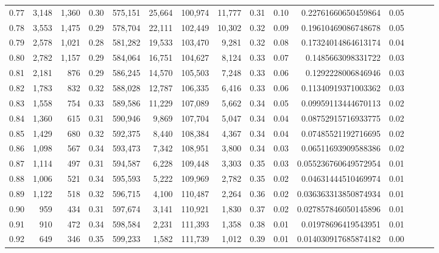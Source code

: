 \begin{tabular}{rrrrrrrrrrrrrrr}
0.77 &   3,148 &  1,360 &  0.30 &  575,151 &   25,664 &  100,974 &   11,777 &  0.31 &  0.10 &     0.22761660650459864 &      0.05 \\
0.78 &   3,553 &  1,475 &  0.29 &  578,704 &   22,111 &  102,449 &   10,302 &  0.32 &  0.09 &     0.19610469086748678 &      0.05 \\
0.79 &   2,578 &  1,021 &  0.28 &  581,282 &   19,533 &  103,470 &    9,281 &  0.32 &  0.08 &     0.17324014864613174 &      0.04 \\
0.80 &   2,782 &  1,157 &  0.29 &  584,064 &   16,751 &  104,627 &    8,124 &  0.33 &  0.07 &      0.1485663098331722 &      0.03 \\
0.81 &   2,181 &    876 &  0.29 &  586,245 &   14,570 &  105,503 &    7,248 &  0.33 &  0.06 &      0.1292228006846946 &      0.03 \\
0.82 &   1,783 &    832 &  0.32 &  588,028 &   12,787 &  106,335 &    6,416 &  0.33 &  0.06 &     0.11340919371003362 &      0.03 \\
0.83 &   1,558 &    754 &  0.33 &  589,586 &   11,229 &  107,089 &    5,662 &  0.34 &  0.05 &     0.09959113444670113 &      0.02 \\
0.84 &   1,360 &    615 &  0.31 &  590,946 &    9,869 &  107,704 &    5,047 &  0.34 &  0.04 &     0.08752915716933775 &      0.02 \\
0.85 &   1,429 &    680 &  0.32 &  592,375 &    8,440 &  108,384 &    4,367 &  0.34 &  0.04 &     0.07485521192716695 &      0.02 \\
0.86 &   1,098 &    567 &  0.34 &  593,473 &    7,342 &  108,951 &    3,800 &  0.34 &  0.03 &     0.06511693909588386 &      0.02 \\
0.87 &   1,114 &    497 &  0.31 &  594,587 &    6,228 &  109,448 &    3,303 &  0.35 &  0.03 &    0.055236760649572954 &      0.01 \\
0.88 &   1,006 &    521 &  0.34 &  595,593 &    5,222 &  109,969 &    2,782 &  0.35 &  0.02 &     0.04631444510469974 &      0.01 \\
0.89 &   1,122 &    518 &  0.32 &  596,715 &    4,100 &  110,487 &    2,264 &  0.36 &  0.02 &    0.036363313850874934 &      0.01 \\
0.90 &     959 &    434 &  0.31 &  597,674 &    3,141 &  110,921 &    1,830 &  0.37 &  0.02 &    0.027857846050145896 &      0.01 \\
0.91 &     910 &    472 &  0.34 &  598,584 &    2,231 &  111,393 &    1,358 &  0.38 &  0.01 &     0.01978696419543951 &      0.01 \\
0.92 &     649 &    346 &  0.35 &  599,233 &    1,582 &  111,739 &    1,012 &  0.39 &  0.01 &    0.014030917685874182 &      0.00 \\

\end{tabular}
